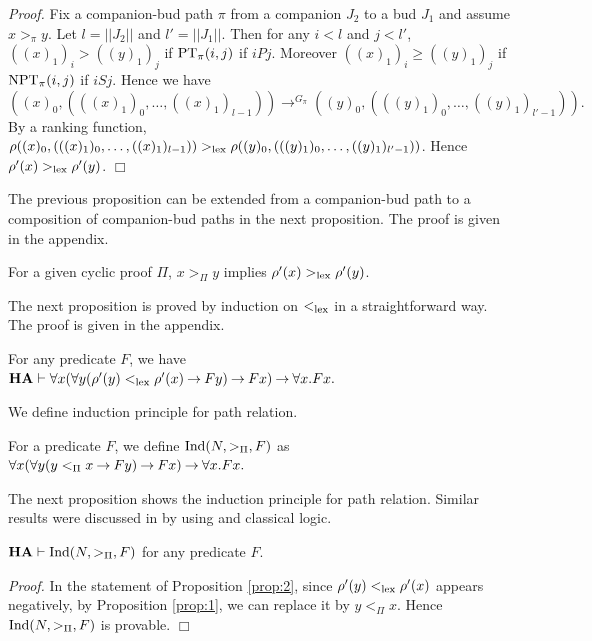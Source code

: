 {\em Proof.}
Fix a companion-bud path $\pi$ from a companion $J_2$ to a bud $J_1$ and
assume $x >_\pi y$.
Let $l=||J_2||$ and $l'=||J_1||$.
Then for any $i<l$ and $j<l'$, 
$((x)_1)_i > ((y)_1)_j$ if ${\rm PT}_\pi(i,j)$ if $i P j$.
Moreover $((x)_1)_i \ge ((y)_1)_j$ if ${\rm NPT}_\pi(i,j)$ if $i S j$.
Hence we have
$
((x)_0,(((x)_1)_0,\ldots,((x)_1)_{l-1})) \to^{G_\pi} ((y)_0,(((y)_1)_0,\ldots,((y)_1)_{l'-1})).
$
By a ranking function,
$\rho((x)_0,(((x)_1)_0,\ldots,((x)_1)_{l-1})) >_{\rm lex} \rho((y)_0,(((y)_1)_0,\ldots,((y)_1)_{l'-1}))$.
Hence $\rho'(x) >_{\rm lex} \rho'(y)$.
$\Box$

The previous proposition can be extended from a companion-bud path to 
a composition of companion-bud paths in the next proposition.
The proof is given in the appendix.

\begin{Prop}\label{prop:1}
For a given cyclic proof $\Pi$,
$x >_\Pi y$ implies $\rho'(x) >_{\rm lex} \rho'(y)$.
\end{Prop}

The next proposition is proved by induction on $<_{\rm lex}$
in a straightforward way.
The proof is given in the appendix.

\begin{Prop}\label{prop:2}
For any predicate $F$, we have
\Break $
{\bf HA} \mathrel \vdash 
\forall x(\forall y(\rho'(y) <_{\rm lex} \rho'(x) \mathbin \to Fy) \mathbin \to Fx)
\mathbin \to \forall x.Fx.
$
\end{Prop}

We define induction principle for path relation.

\begin{Def}[$\Ind(N,>_\Pi,F)$]\rm
For a predicate $F$, we define $\Ind(N,>_\Pi,F)$ as
$
\forall x(\forall y(y <_\Pi x \mathbin \to Fy) \mathbin \to Fx)
\mathbin \to \forall x.Fx.
$
\end{Def}

The next proposition shows the induction principle for path relation.
Similar results were discussed in \cite{Ikebuchi25}
by using \cite{Lee09} and classical logic.

\begin{Prop}\label{prop:ind}
\Break ${\bf HA} \mathrel \vdash {\rm Ind}(N,>_\Pi,F)$ for any predicate $F$.
\end{Prop}

{\em Proof.}
In the statement of Proposition \ref{prop:2},
since $\rho'(y) <_{\rm lex} \rho'(x)$ appears negatively,
by Proposition \ref{prop:1}, we can replace it by $y <_\Pi x$.
Hence $\Ind(N,>_\Pi,F)$ is provable.
$\Box$

